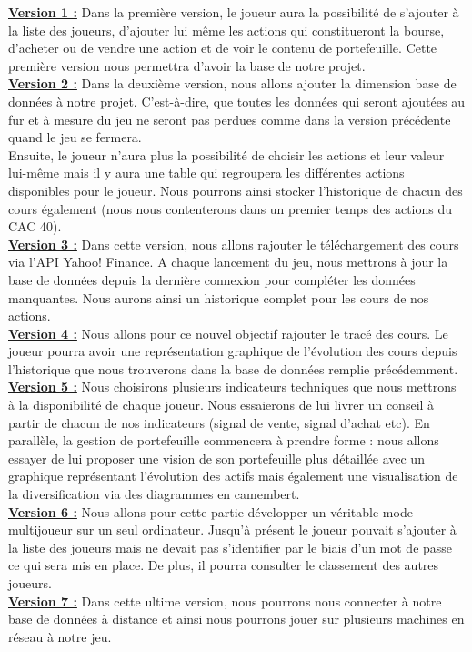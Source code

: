 \underline{\textbf{Version 1 :}}
Dans la première version, le joueur aura la possibilité de s'ajouter à la liste des joueurs, d'ajouter lui même les actions qui constitueront la bourse, d'acheter ou de vendre une action et de voir le contenu de portefeuille.
Cette première version nous permettra d'avoir la base de notre projet.\\

\underline{\textbf{Version 2 :}}
Dans la deuxième version, nous allons ajouter la dimension base de données à notre projet. C'est-à-dire, que toutes les données qui seront ajoutées au fur et à mesure du jeu ne seront pas perdues comme dans la version précédente quand le jeu se fermera. \\
Ensuite, le joueur n'aura plus la possibilité de choisir les actions et leur valeur lui-même mais il y aura une table qui regroupera les différentes actions disponibles pour le joueur. Nous pourrons ainsi stocker l'historique de chacun des cours également (nous nous contenterons dans un premier temps des actions du CAC 40).\\

\underline{\textbf{Version 3 :}}
Dans cette version, nous allons rajouter le téléchargement des cours via l'API Yahoo! Finance. A chaque lancement du jeu, nous mettrons à jour la base de données depuis la dernière connexion pour compléter les données manquantes. Nous aurons ainsi un historique complet pour les cours de nos actions. \\

\underline{\textbf{Version 4 :}}
Nous allons pour ce nouvel objectif rajouter le tracé des cours. Le joueur pourra avoir une représentation graphique de l'évolution des cours depuis l'historique que nous trouverons dans la base de données remplie précédemment. \\

\underline{\textbf{Version 5 :}}
Nous choisirons plusieurs indicateurs techniques que nous mettrons à la disponibilité de chaque joueur. Nous essaierons de lui livrer un conseil à partir de chacun de nos indicateurs (signal de vente, signal d'achat etc). En parallèle, la gestion de portefeuille commencera à prendre forme : nous allons essayer de lui proposer une vision de son portefeuille plus détaillée avec un graphique représentant l'évolution des actifs mais également une visualisation de la diversification via des diagrammes en camembert.\\

\underline{\textbf{Version 6 :}}
Nous allons pour cette partie développer un véritable mode multijoueur sur un seul ordinateur. Jusqu'à présent le joueur pouvait s'ajouter à la liste des joueurs mais ne devait pas s'identifier par le biais d'un mot de passe ce qui sera mis en place. De plus, il pourra consulter le classement des autres joueurs. \\

\underline{\textbf{Version 7 :}}
Dans cette ultime version, nous pourrons nous connecter à notre base de données à distance et ainsi nous pourrons jouer sur plusieurs machines en réseau à notre jeu. 